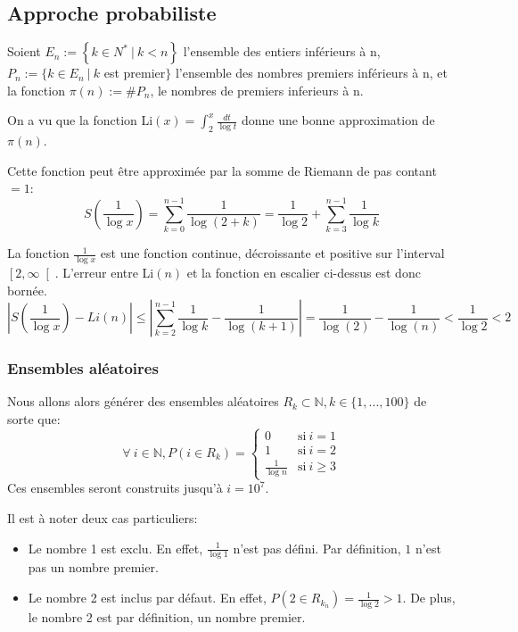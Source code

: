\documentclass[../main.tex]{report}
\begin{document}
    \label{sec:test1}
    
\subsection{Approche probabiliste}
Soient $E_n := \left\{ k \in N^* ~|~k < n \right\}$ l'ensemble des entiers inférieurs à n, $ P_n := \{k \in E_n~|~ k$ est premier$ \}$ l'ensemble des nombres premiers inférieurs à n, et la fonction $\pi (n) := \#P_n$, le nombres de premiers inferieurs à n.

On a vu que la fonction Li$(x) = \int_2^x \frac{dt}{\log t}$ 
donne une bonne approximation de $\pi(n)$.

Cette fonction peut être approximée par la somme de Riemann de pas contant $=1$:
\begin{equation}
\label{eq:SommeDeRiemann}
S \left({\frac{1}{\log x}} \right)
= \sum_{k=0}^{n-1} \frac{1}{\log(2 + k)}
= \frac{1}{\log 2} + \sum_{k=3}^{n-1} \frac{1}{\log k}
\end{equation}


La fonction $\frac{1}{\log x}$ est une fonction continue, décroissante et positive sur l'interval $\left[2, \infty \right[$. 
L'erreur entre Li$(n)$ et la fonction en escalier ci-dessus est donc bornée. 
 \[ 
\left| S\left(\frac{1}{\log x}\right) - Li(n) \right|
\leq \left| \sum_{k=2}^{n-1} \frac{1}{\log k} - \frac{1}{\log (k+1)} \right| 
 = \frac{1}{\log (2)} - \frac{1}{\log (n)}
 < \frac{1}{\log 2}
 < 2
 \]


\subsubsection{Ensembles aléatoires} 

Nous allons alors générer des ensembles aléatoires $R_{k} \subset \mathbb{N}, k \in \{1,...,100\}$ de sorte que:
\[
\forall~i \in \mathbb{N}, P(i \in R_{k}) = 
\left\{ 
    \begin{array}{cl}
         0 & \mbox{si}~i = 1 \\
         1 & \mbox{si}~i = 2 \\
         \frac{1}{\log n} & \mbox{si}~i \geq 3
    \end{array}
\right.
\]
Ces ensembles seront construits jusqu'à $i = 10^7$.

Il est à noter deux cas particuliers:
\begin{itemize} 
    \item Le nombre 1 est exclu. En effet, $\frac{1}{\log 1}$ n'est pas défini. Par définition, $1$ n'est pas un nombre premier.
    \item Le nombre 2 est inclus par défaut. En effet, $P(2 \in R_{k_n}) = \frac{1}{\log 2} > 1$. De plus, le nombre 2 est par définition, un nombre premier.
\end{itemize}
\end{document}
